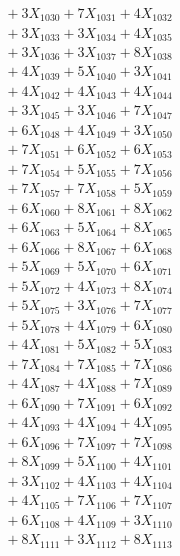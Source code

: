\documentclass[a4paper,10pt]{article}
\begin{document}
{\begin{align}
&\;  + 3 X_{1030} + 7 X_{1031} + 4 X_{1032} \\[0.3ex]
&\;  + 3 X_{1033} + 3 X_{1034} + 4 X_{1035} \\[0.3ex]
&\;  + 3 X_{1036} + 3 X_{1037} + 8 X_{1038} \\[0.3ex]
&\;  + 4 X_{1039} + 5 X_{1040} + 3 X_{1041} \\[0.3ex]
&\;  + 4 X_{1042} + 4 X_{1043} + 4 X_{1044} \\[0.3ex]
&\;  + 3 X_{1045} + 3 X_{1046} + 7 X_{1047} \\[0.3ex]
&\;  + 6 X_{1048} + 4 X_{1049} + 3 X_{1050} \\[0.3ex]
&\;  + 7 X_{1051} + 6 X_{1052} + 6 X_{1053} \\[0.3ex]
&\;  + 7 X_{1054} + 5 X_{1055} + 7 X_{1056} \\[0.3ex]
&\;  + 7 X_{1057} + 7 X_{1058} + 5 X_{1059} \\[0.5ex]\allowbreak
&\;  + 6 X_{1060} + 8 X_{1061} + 8 X_{1062} \\[0.3ex]
&\;  + 6 X_{1063} + 5 X_{1064} + 8 X_{1065} \\[0.3ex]
&\;  + 6 X_{1066} + 8 X_{1067} + 6 X_{1068} \\[0.3ex]
&\;  + 5 X_{1069} + 5 X_{1070} + 6 X_{1071} \\[0.3ex]
&\;  + 5 X_{1072} + 4 X_{1073} + 8 X_{1074} \\[0.3ex]
&\;  + 5 X_{1075} + 3 X_{1076} + 7 X_{1077} \\[0.3ex]
&\;  + 5 X_{1078} + 4 X_{1079} + 6 X_{1080} \\[0.3ex]
&\;  + 4 X_{1081} + 5 X_{1082} + 5 X_{1083} \\[0.3ex]
&\;  + 7 X_{1084} + 7 X_{1085} + 7 X_{1086} \\[0.3ex]
&\;  + 4 X_{1087} + 4 X_{1088} + 7 X_{1089} \\[0.5ex]\allowbreak
&\;  + 6 X_{1090} + 7 X_{1091} + 6 X_{1092} \\[0.3ex]
&\;  + 4 X_{1093} + 4 X_{1094} + 4 X_{1095} \\[0.3ex]
&\;  + 6 X_{1096} + 7 X_{1097} + 7 X_{1098} \\[0.3ex]
&\;  + 8 X_{1099} + 5 X_{1100} + 4 X_{1101} \\[0.3ex]
&\;  + 3 X_{1102} + 4 X_{1103} + 4 X_{1104} \\[0.3ex]
&\;  + 4 X_{1105} + 7 X_{1106} + 7 X_{1107} \\[0.3ex]
&\;  + 6 X_{1108} + 4 X_{1109} + 3 X_{1110} \\[0.3ex]
&\;  + 8 X_{1111} + 3 X_{1112} + 8 X_{1113} \\[0.3ex]

\end{align}}
\end{document}
